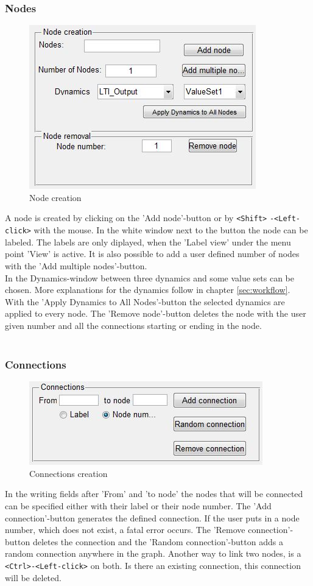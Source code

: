 \documentclass[12pt]{report}
\begin{document}
\subsubsection{Nodes}
\begin{figure}[h]
\centering
\includegraphics[scale=.8]{nodes2}
\caption{Node creation}
\label{FIG:abb32}
\end{figure}
A node is created by clicking on the 'Add node'-button or by \texttt{<Shift>} \texttt{-<Left-click>} with the mouse. In the white window next to the button the node can be labeled. The labels are only diplayed, when the 'Label view' under the menu point 'View' is active. It is also possible to add a user defined number of nodes with the 'Add multiple nodes'-button.\\
In the Dynamics-window between three dynamics and some value sets can be chosen. More explanations for the dynamics follow in chapter \ref{sec:workflow}.
With the 'Apply Dynamics to All Nodes'-button the selected dynamics are applied to every node.
The 'Remove node'-button deletes the node with the user given number and all the connections starting or ending in the node.\\
\\
\subsubsection{Connections}
\begin{figure}[h]
\centering
\includegraphics[scale=.8]{connectionsa}
\caption{Connections creation}
\label{FIG:abb33}
\end{figure}
In the writing fields after 'From' and 'to node' the nodes that will be connected can be specified either with their label or their node number. The 'Add connection'-button generates the defined connection. If the user puts in a node number, which does not exist, a fatal error occurs. The 'Remove connection'-button deletes the connection and the 'Random connection'-button adds a random connection anywhere in the graph. Another way to link two nodes, is a \texttt{<Ctrl>-<Left-click>} on both. Is there an existing connection, this connection will be deleted.\\
\\
\end{document}
